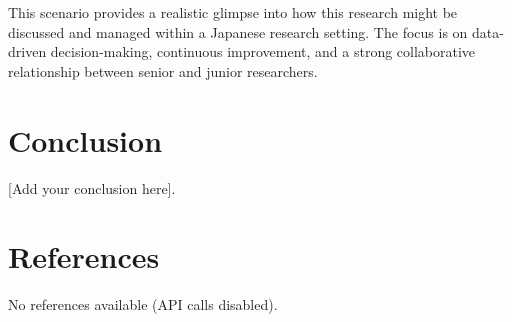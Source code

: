 \documentclass{article}
\begin{document}
This scenario provides a realistic glimpse into how this research might be discussed and managed within a Japanese research setting. The focus is on data-driven decision-making, continuous improvement, and a strong collaborative relationship between senior and junior researchers.


\section{Conclusion}
[Add your conclusion here].

\section{References}
No references available (API calls disabled).
\end{document}

